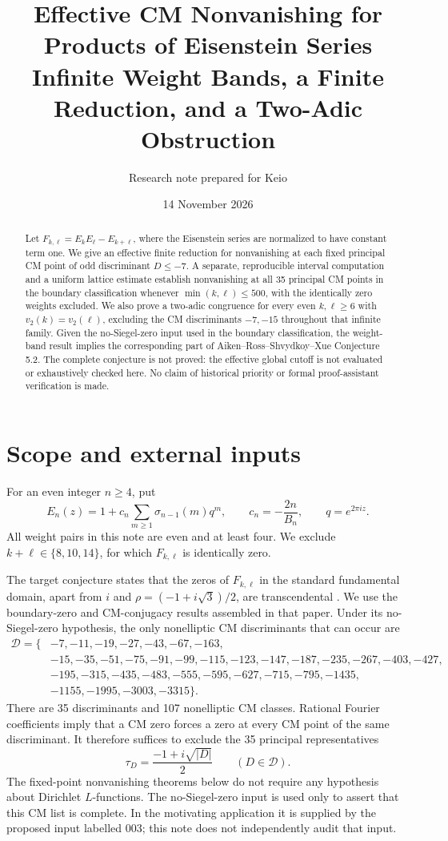 \documentclass[11pt]{article}
\title{Effective CM Nonvanishing for Products of Eisenstein Series\\[4pt]\large Infinite Weight Bands, a Finite Reduction, and a Two-Adic Obstruction}
\author{Research note prepared for Keio}
\date{14 November 2026}
\begin{document}
\maketitle
\begin{abstract}
Let $F_{k,\ell}=E_kE_\ell-E_{k+\ell}$, where the Eisenstein series are normalized to have constant term one. We give an effective finite reduction for nonvanishing at each fixed principal CM point of odd discriminant $D\le-7$. A separate, reproducible interval computation and a uniform lattice estimate establish nonvanishing at all 35 principal CM points in the boundary classification whenever $\min(k,\ell)\le500$, with the identically zero weights excluded. We also prove a two-adic congruence for every even $k,\ell\ge6$ with $v_2(k)=v_2(\ell)$, excluding the CM discriminants $-7,-15$ throughout that infinite family. Given the no-Siegel-zero input used in the boundary classification, the weight-band result implies the corresponding part of Aiken--Ross--Shvydkoy--Xue Conjecture 5.2. The complete conjecture is not proved: the effective global cutoff is not evaluated or exhaustively checked here. No claim of historical priority or formal proof-assistant verification is made.
\end{abstract}

\section{Scope and external inputs}
For an even integer $n\ge4$, put
\[
 E_n(z)=1+c_n\sum_{m\ge1}\sigma_{n-1}(m)q^m,
 \qquad c_n=-\frac{2n}{B_n},\qquad q=e^{2\pi iz}.
\]
All weight pairs in this note are even and at least four. We exclude $k+\ell\in\{8,10,14\}$, for which $F_{k,\ell}$ is identically zero.

The target conjecture states that the zeros of $F_{k,\ell}$ in the standard fundamental domain, apart from $i$ and $\rho=(-1+i\sqrt3)/2$, are transcendental \cite{ARSX}. We use the boundary-zero and CM-conjugacy results assembled in that paper. Under its no-Siegel-zero hypothesis, the only nonelliptic CM discriminants that can occur are
\begin{align*}
\mathcal D=\{&-7,-11,-19,-27,-43,-67,-163,\\
&-15,-35,-51,-75,-91,-99,-115,-123,-147,-187,-235,-267,-403,-427,\\
&-195,-315,-435,-483,-555,-595,-627,-715,-795,-1435,\\
&-1155,-1995,-3003,-3315\}.
\end{align*}
There are 35 discriminants and 107 nonelliptic CM classes. Rational Fourier coefficients imply that a CM zero forces a zero at every CM point of the same discriminant. It therefore suffices to exclude the 35 principal representatives
\[
 \tau_D=\frac{-1+i\sqrt{|D|}}2\qquad(D\in\mathcal D).
\]
The fixed-point nonvanishing theorems below do not require any hypothesis about Dirichlet $L$-functions. The no-Siegel-zero input is used only to assert that this CM list is complete. In the motivating application it is supplied by the proposed input labelled 003; this note does not independently audit that input.
\end{document}
